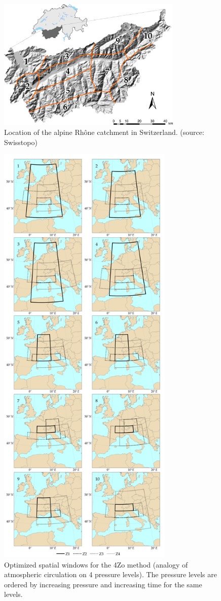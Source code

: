 \documentclass[review]{elsarticle}
\begin{document}
\begin{figure}[t]
	\centerline{\includegraphics[width=8.8cm]{figures/fig01.pdf}}
	\caption{Location of the alpine Rh\^{o}ne catchment in Switzerland. (source: Swisstopo)}
	\label{fig:map}
\end{figure}

\begin{figure}[t]
	\centerline{\includegraphics[width=8.4cm]{figures/fig02.pdf}}
	\caption{Optimized spatial windows for the 4Zo method (analogy of atmospheric circulation on 4 pressure levels). The pressure levels are ordered by increasing pressure and increasing time for the same levels.}
	\label{fig:spatial_windows_4Zo}
\end{figure}
\end{document}
